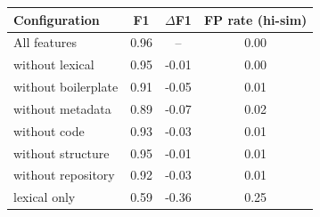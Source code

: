 \begin{tabular}{lccc}
\toprule
Configuration & F1 & $\Delta$F1 & FP rate (hi-sim) \\
\midrule
All features & 0.96 & -- & 0.00 \\
without lexical & 0.95 & -0.01 & 0.00 \\
without boilerplate & 0.91 & -0.05 & 0.01 \\
without metadata & 0.89 & -0.07 & 0.02 \\
without code & 0.93 & -0.03 & 0.01 \\
without structure & 0.95 & -0.01 & 0.01 \\
without repository & 0.92 & -0.03 & 0.01 \\
lexical only & 0.59 & -0.36 & 0.25 \\
\bottomrule
\end{tabular}
